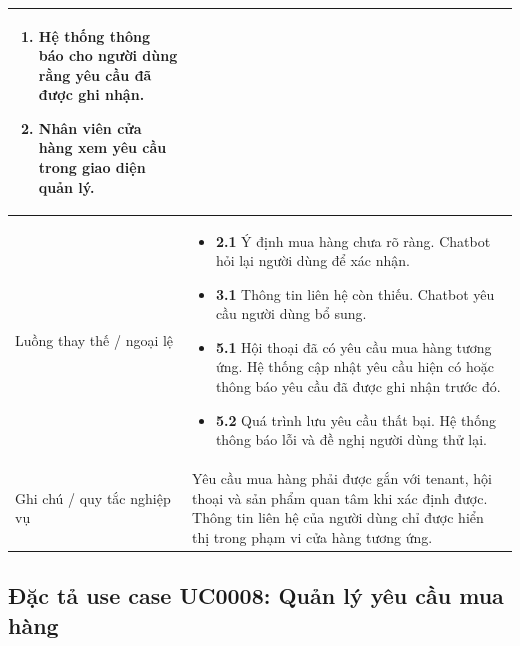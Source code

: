 \documentclass[../DoAn.tex]{subfiles}
\begin{document}
\begin{longtable}{|p{}|p{}|}
\begin{minipage}[t]{0.68\textwidth}
\begin{enumerate}
    \item Hệ thống thông báo cho người dùng rằng yêu cầu đã được ghi nhận.
    \item Nhân viên cửa hàng xem yêu cầu trong giao diện quản lý.
\end{enumerate}
\end{minipage}
\\
\hline
Luồng thay thế / ngoại lệ &
\begin{minipage}[t]{0.68\textwidth}
\begin{itemize}
    \item \textbf{2.1} Ý định mua hàng chưa rõ ràng. Chatbot hỏi lại người dùng để xác nhận.
    \item \textbf{3.1} Thông tin liên hệ còn thiếu. Chatbot yêu cầu người dùng bổ sung.
    \item \textbf{5.1} Hội thoại đã có yêu cầu mua hàng tương ứng. Hệ thống cập nhật yêu cầu hiện có hoặc thông báo yêu cầu đã được ghi nhận trước đó.
    \item \textbf{5.2} Quá trình lưu yêu cầu thất bại. Hệ thống thông báo lỗi và đề nghị người dùng thử lại.
\end{itemize}
\end{minipage}
\\
\hline
Ghi chú / quy tắc nghiệp vụ & Yêu cầu mua hàng phải được gắn với tenant, hội thoại và sản phẩm quan tâm khi xác định được. Thông tin liên hệ của người dùng chỉ được hiển thị trong phạm vi cửa hàng tương ứng. \\
\hline
\end{longtable}

\subsection{Đặc tả use case UC0008: Quản lý yêu cầu mua hàng}
\label{subsection:2.3.8}
\end{document}
